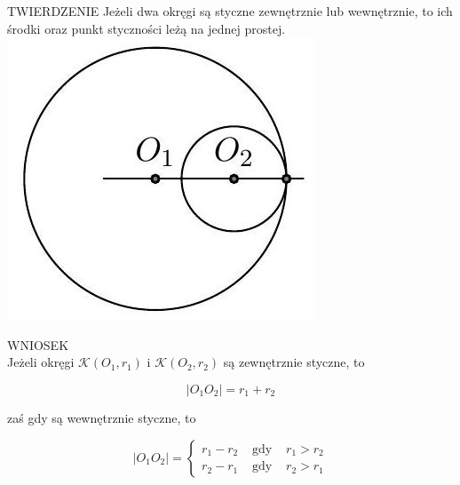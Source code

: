 \documentclass[10pt]{article}
\begin{document}
TWIERDZENIE Jeżeli dwa okręgi są styczne zewnętrznie lub wewnętrznie, to ich środki oraz punkt styczności leżą na jednej prostej.\\
\includegraphics[max width=\textwidth, center]{2024_11_21_e9b4faa005d5be2cc318g-035}

WNIOSEK\\
Jeżeli okręgi \(\mathcal{K}\left(O_{1}, r_{1}\right)\) i \(\mathcal{K}\left(O_{2}, r_{2}\right)\) są zewnętrznie styczne, to

\[
\left|O_{1} O_{2}\right|=r_{1}+r_{2}
\]

zaś gdy są wewnętrznie styczne, to

\[
\left|O_{1} O_{2}\right|=\left\{\begin{array}{lll}
r_{1}-r_{2} & \text { gdy } & r_{1}>r_{2} \\
r_{2}-r_{1} & \text { gdy } & r_{2}>r_{1}
\end{array}\right.
\]
\end{document}

